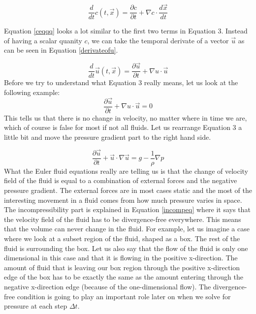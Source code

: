\begin{equation}
\frac{d}{dt}c(t,\vec{x}) = \frac{\partial c}{\partial t} + \nabla c \cdot \frac{d\vec{x}}{dt}
\label{ceqqq}
\end{equation}

\noindent
Equation \ref{ceqqq} looks a lot similar to the first two terms in Equation 3. Instead of having a scalar quanity $c$, we can take the temporal derivate of a vector $\vec{u}$ as can be seen in Equation \ref{derivateofu}.

\begin{equation}
\frac{d}{dt}\vec{u}(t,\vec{x}) =  \frac{\partial \vec{u}}{\partial t} + \nabla u \cdot \vec{u}
\label{derivateofu}
\end{equation}
\noindent
Before we try to understand what Equation 3 really means, let us look at the following example:
\begin{equation}
\frac{\partial \vec{u}}{\partial t} + \nabla u \cdot \vec{u} = 0
\end{equation}
\noindent
This tells us that there is no change in velocity, no matter where in time we are, which of course is false for  most if not all fluids. Let us rearrange Equation 3 a little bit and move the pressure gradient part to the right hand side.

\begin{equation}
\frac{\partial \vec{u}}{\partial t} + \vec{u} \cdot \nabla \vec{u} = g - \frac{1}{\rho}\nabla p 
\end{equation}
\noindent
What the Euler fluid equations really are telling us is that the change of velocity field of the fluid is equal to a combination of external forces and the negative pressure gradient. The external forces are in most cases static and the most of the interesting movement in a fluid comes from how much pressure varies in space. 
\newline
\newline
The incompressibility part is explained in Equation \ref{incompeq} where it says that the velocity field of the fluid has to be divergence-free everywhere. This means that the volume can never change in the fluid. For example, let us imagine a case where we look at a subset region of the fluid, shaped as a box. The rest of the fluid is surrounding the box. Let us also say that the flow of the fluid is only one dimensional in this case and that it is flowing in the positive x-direction. The amount of fluid that is leaving our box region through the positive x-direction edge of the box has to be exactly the same as the amount entering through the negative x-direction edge (because of the one-dimensional flow). The divergence-free condition is going to play an important role later on when we solve for pressure at each step $\Delta t$.
